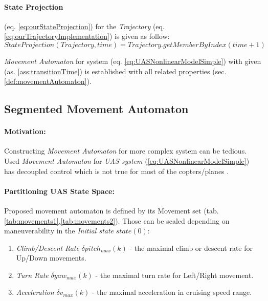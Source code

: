 \paragraph{State Projection} (eq. \ref{eq:ourStateProjection}) for the \emph{Trajectory} (eq. \ref{eq:ourTrajectoryImplementation}) is given as follow:
\begin{equation}\label{eq:ourStateProjection}
    StateProjection(Trajectory,time) = Trajectory.getMemberByIndex(time+1)
\end{equation}

\begin{note}
    \emph{Movement Automaton} for system (eq. \ref{eq:UASNonlinearModelSimple}) with given (as. \ref{ass:transitionTime}) is established with all related properties (sec. \ref{def:movementAutomaton}).
\end{note}

\newpage
\subsection{Segmented Movement Automaton}\label{s:segmentedMovementAutomaton}
\paragraph{Motivation:} Constructing \emph{Movement Automaton} for more complex system can be tedious. Used \emph{Movement Automaton} for \emph{UAS system} (\ref{eq:UASNonlinearModelSimple}) has decoupled control which is not true for most of the copters/planes \cite{fossen2011mathematical}.

\paragraph{Partitioning UAS State Space:} Proposed movement automaton is defined by its Movement set (tab. \ref{tab:movements1},\ref{tab:movements2}). Those can be scaled depending on maneuverability in the  \emph{Initial state} $state(0)$:
\begin{enumerate}
    \item \emph{Climb/Descent Rate} $\delta pitch_{max}(k)$ - the maximal climb or descent rate for Up/Down movements.
    \item \emph{Turn Rate} $\delta yaw_{max}(k)$ - the maximal turn rate for Left/Right movement.
    \item \emph{Acceleration} $\delta v_{max}(k)$ - the maximal acceleration in cruising speed range.
\end{enumerate}

